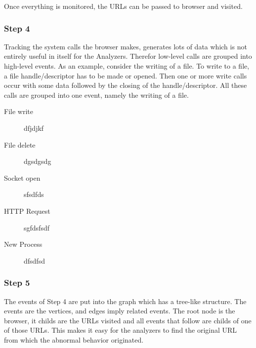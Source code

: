 Once everything is monitored, the URLs can be passed to browser and visited.

\subsubsection{Step 4}

Tracking the system calls the browser makes, generates lots of data which is not entirely useful in itself for the Analyzers. Therefor low-level calls are grouped into high-level events. As an example, consider the writing of a file. To write to a file, a file handle/descriptor has to be made or opened. Then one or more write calls occur with some data followed by the closing of the handle/descriptor. All these calls are grouped into one event, namely the writing of a file.\\


\begin{description}
\item[File write] dfjdjkf
\item[File delete] dgsdgsdg
\item[Socket open] sfsdfds
\item[HTTP Request] sgfdsfsdf
\item[New Process] dfsdfsd
\end{description}

\subsubsection{Step 5}

The events of Step 4 are put into the graph which has a tree-like structure. The events are the vertices, and edges imply related events. The root node is the browser, it childs are the URLs visited and all events that follow are childs of one of those URLs. This makes it easy for the analyzers to find the original URL from which the abnormal behavior originated. 


